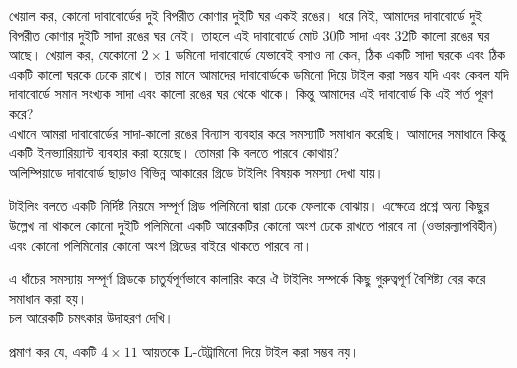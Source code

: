 \documentclass[11pt]{report}
\begin{document}
\begin{center}
\end{center}

খেয়াল কর, কোনো দাবাবোর্ডের দুই বিপরীত কোণার দুইটি ঘর একই রঙের। ধরে নিই, আমাদের দাবাবোর্ডে দুই বিপরীত কোণার দুইটি সাদা রঙের ঘর নেই। তাহলে এই দাবাবোর্ডে মোট $30$টি সাদা এবং $32$টি কালো রঙের ঘর আছে। খেয়াল কর, যেকোনো $2 \times 1$ ডমিনো দাবাবোর্ডে যেভাবেই বসাও না কেন, ঠিক একটি সাদা ঘরকে এবং ঠিক একটি কালো ঘরকে ঢেকে রাখে। তার মানে আমাদের দাবাবোর্ডকে ডমিনো দিয়ে টাইল করা সম্ভব যদি এবং কেবল যদি দাবাবোর্ডে সমান সংখ্যক সাদা এবং কালো রঙের ঘর থেকে থাকে। কিন্তু আমাদের এই দাবাবোর্ড কি এই শর্ত পূরণ করে?\\

এখানে আমরা দাবাবোর্ডের সাদা-কালো রঙের বিন্যাস ব্যবহার করে সমস্যাটি সমাধান করেছি। আমাদের সমাধানে কিন্তু একটি ইনভ্যারিয়্যান্ট ব্যবহার করা হয়েছে। তোমরা কি বলতে পারবে কোথায়?\\

অলিম্পিয়াডে দাবাবোর্ড ছাড়াও বিভিন্ন আকারের গ্রিডে টাইলিং বিষয়ক সমস্যা দেখা যায়।

\begin{tcolorbox}[colframe=blue!80!blue]
টাইলিং বলতে একটি নির্দিষ্ট নিয়মে সম্পূর্ণ গ্রিড পলিমিনো দ্বারা ঢেকে ফেলাকে বোঝায়। এক্ষেত্রে প্রশ্নে অন্য কিছুর উল্লেখ না থাকলে কোনো দুইটি পলিমিনো একটি আরেকটির কোনো অংশ ঢেকে রাখতে পারবে না (ওভারল্যাপবিহীন) এবং কোনো পলিমিনোর কোনো অংশ গ্রিডের বাইরে থাকতে পারবে না।
\end{tcolorbox}

এ ধাঁচের সমস্যায় সম্পূর্ণ গ্রিডকে চাতুর্যপূর্ণভাবে কালারিং করে ঐ টাইলিং সম্পর্কে কিছু গুরুত্বপূর্ণ বৈশিষ্ট্য বের করে সমাধান করা হয়।\\

চল আরেকটি চমৎকার উদাহরণ দেখি।\\

\begin{tcolorbox}[colframe=black!80!green,title=উদাহরণ 1.2.2]
প্রমাণ কর যে, একটি $4 \times 11$ আয়তকে L-টেট্রামিনো দিয়ে টাইল করা সম্ভব নয়।
\end{tcolorbox}
\end{document}
